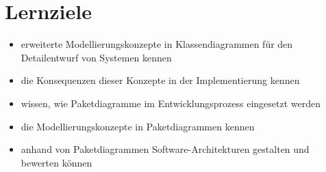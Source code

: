 \section{Lernziele}
\begin{itemize}
    \item erweiterte Modellierungskonzepte in Klassendiagrammen für den Detailentwurf von Systemen kennen
    \item die Konsequenzen dieser Konzepte in der Implementierung kennen
    \item wissen, wie Paketdiagramme im Entwicklungsprozess eingesetzt werden
    \item die Modellierungskonzepte in Paketdiagrammen kennen
    \item anhand von Paketdiagrammen Software-Architekturen gestalten und bewerten können
\end{itemize}
